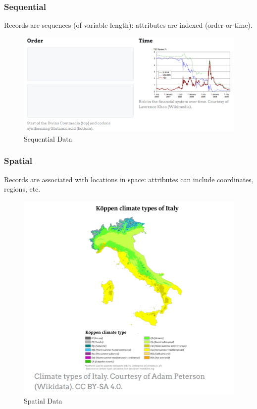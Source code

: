 \subsubsection{Sequential}
\begin{paracol}{2}
   Records are sequences (of variable length): attributes are indexed (order or time).
   

   \switchcolumn
   
   \begin{figure}[htbp]
      \centering
      \includegraphics{images/01/sequential.png}
      \caption{Sequential Data}

      \label{fig:01/sequential}
   \end{figure}
\end{paracol}

\subsubsection{Spatial}
\begin{paracol}{2}
   

   Records are associated with locations in space: attributes can include coordinates, regions, etc.
   \switchcolumn
   
   \begin{figure}[htbp]
      \centering
      \includegraphics{images/01/spatial.png}
      \caption{Spatial Data}
      \label{fig:01/spatial}
   \end{figure}
\end{paracol}

